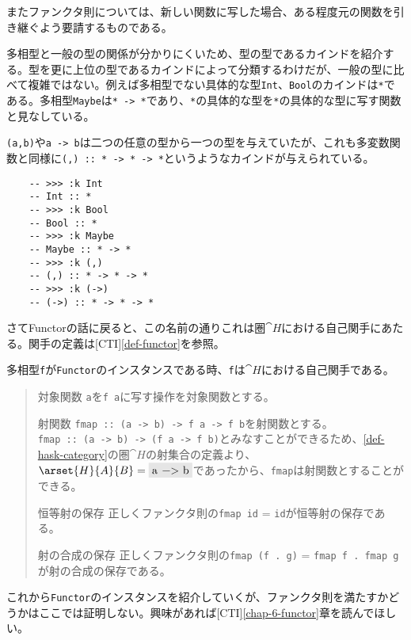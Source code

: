 \documentclass[uplatex,dvipdfmx]{jsarticle}
\newcommand{\pr}[1]{\colorbox[rgb]{0.9,0.9,0.9}{\lstinline{#1}}}
\newcommand{\refcti}[1]{[CTI]\ref{#1}}
\begin{document}
  またファンクタ則については、新しい関数に写した場合、ある程度元の関数を引き継ぐよう要請するものである。

  多相型と一般の型の関係が分かりにくいため、型の型であるカインドを紹介する。型を更に上位の型であるカインドによって分類するわけだが、一般の型に比べて複雑ではない。例えば多相型でない具体的な型\pr{Int}、\pr{Bool}のカインドは\pr{*}である。多相型\pr{Maybe}は\pr{* -> *}であり、\pr{*}の具体的な型を\pr{*}の具体的な型に写す関数と見なしている。

  \pr{(a,b)}や\pr{a -> b}は二つの任意の型から一つの型を与えていたが、これも多変数関数と同様に\pr{(,) :: * -> * -> *}というようなカインドが与えられている。

  \begin{lstlisting}
    -- >>> :k Int
    -- Int :: *
    -- >>> :k Bool
    -- Bool :: *
    -- >>> :k Maybe
    -- Maybe :: * -> *
    -- >>> :k (,)
    -- (,) :: * -> * -> *
    -- >>> :k (->)
    -- (->) :: * -> * -> *
  \end{lstlisting}

  さてFunctorの話に戻ると、この名前の通りこれは圏$\cat{H}$における自己関手にあたる。関手の定義は\refcti{def-functor}を参照。
  \begin{prop}\label{prop-functor-is-self-functor}
    多相型\pr{f}が\pr{Functor}のインスタンスである時、\pr{f}は$\cat{H}$における自己関手である。
    \begin{quote}
			\begin{mydescription}
		\item[対象関数] \pr{a}を\pr{f a}に写す操作を対象関数とする。
		\item[射関数] \pr{fmap :: (a -> b) -> f a -> f b}を射関数とする。\\
    \pr{fmap :: (a -> b) -> (f a -> f b)}とみなすことができるため、\ref{def-hask-category}の圏$\cat{H}$の射集合の定義より、$\arset{H}{A}{B}=\pr{a -> b}$であったから、\pr{fmap}は射関数とすることができる。
		\item[恒等射の保存] 正しくファンクタ則の\pr{fmap id} = \pr{id}が恒等射の保存である。
		\item[射の合成の保存] 正しくファンクタ則の\pr{fmap (f . g)} = \pr{fmap f . fmap g}が射の合成の保存である。
		\end{mydescription}
		\end{quote}
  \end{prop}
  これから\pr{Functor}のインスタンスを紹介していくが、ファンクタ則を満たすかどうかはここでは証明しない。興味があれば\refcti{chap-6-functor}章を読んでほしい。
\end{document}
